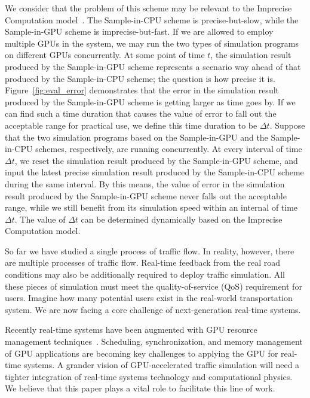 \documentclass[times, 10pt, twocolumn]{article}
\begin{document}
We consider that the problem of this scheme may be relevant to the
Imprecise Computation model~\cite{Lin1987}.
The Sample-in-CPU scheme is precise-but-slow, while the Sample-in-GPU
scheme is imprecise-but-fast.
If we are allowed to employ multiple GPUs in the system, we may run the
two types of simulation programs on different GPUs concurrently.
At some point of time $t$, the simulation result produced by the
Sample-in-GPU scheme represents a scenario way ahead of that produced by
the Sample-in-CPU scheme; the question is how precise it is.
Figure~\ref{fig:eval_error} demonstrates that the error in the
simulation result produced by the Sample-in-GPU scheme is getting larger
as time goes by.
If we can find such a time duration that causes the value of error to
fall out the acceptable range for practical use, we define this time
duration to be $\Delta t$.
Suppose that the two simulation programs based on the Sample-in-GPU and
the Sample-in-CPU schemes, respectively, are running concurrently.
At every interval of time $\Delta t$, we reset the simulation result
produced by the Sample-in-GPU scheme, and input the latest precise
simulation result produced by the Sample-in-CPU scheme during the same
interval.
By this means, the value of error in the simulation result produced by
the Sample-in-GPU scheme never falls out the acceptable range, while we
still benefit from its simulation speed within an internal of time
$\Delta t$.
The value of $\Delta t$ can be determined dynamically based on the
Imprecise Computation model.

So far we have studied a single process of traffic flow.
In reality, however, there are multiple processes of traffic flow.
Real-time feedback from the real road conditions may also be
additionally required to deploy traffic simulation.
All these pieces of simulation must meet the quality-of-service (QoS)
requirement for users.
Imagine how many potential users exist in the real-world transportation
system.
We are now facing a core challenge of next-generation real-time
systems.

Recently real-time systems have been augmented with GPU resource
management techniques~\cite{Elliott_RTS12, Elliott_ECRTS12, Kato2011_3,
Kato2011_2, Kato2011_1, Kato2012, Liu_PACT12}.
Scheduling, synchronization, and memory management of GPU applications
are becoming key challenges to applying the GPU for real-time systems.
A grander vision of GPU-accelerated traffic simulation will need a
tighter integration of real-time systems technology and computational
physics.
We believe that this paper plays a vital role to facilitate this line of
work.
\end{document}
